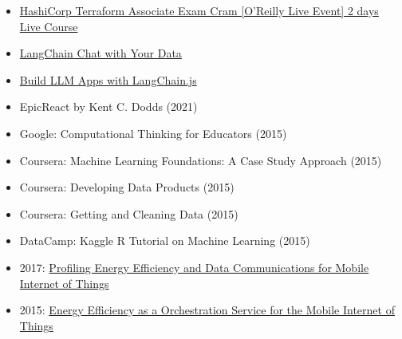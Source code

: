 \begin{minipage}[t]{0.29\textwidth}
{\begin{minipage}[t][293mm][t]{0.82\textwidth}
    \Large
    \Large
    \begin{itemize}
        \item {\href{https://github.com/p10ns11y/oreilly-terraform-live-course-sessions}{\color{sidebarlinkcolor}HashiCorp Terraform Associate Exam Cram [O'Reilly Live Event] 2 days Live Course}}
        \item {\href{https://learn.deeplearning.ai/accomplishments/f72f24f1-9ad2-4bc0-b8c2-33cbecb81ec2}{\color{sidebarlinkcolor}LangChain Chat with Your Data}}
        \item {\href{https://learn.deeplearning.ai/accomplishments/14907d64-9ff2-4dc7-b5f7-ce42982f8551?usp=sharing}{\color{sidebarlinkcolor}Build LLM Apps with LangChain.js}}
    \end{itemize}

    \Large
    \Large
    \begin{itemize}
        \item EpicReact by Kent C. Dodds (2021)
        \item Google: Computational Thinking for Educators (2015)
        \item Coursera: Machine Learning Foundations: A Case Study Approach (2015)
        \item Coursera: Developing Data Products (2015)
        \item Coursera: Getting and Cleaning Data (2015)
        \item DataCamp: Kaggle R Tutorial on Machine Learning (2015)
    \end{itemize}

    \Large
    \Large
    \begin{itemize}
        \item 2017: {\href{https://onlinelibrary.wiley.com/doi/10.1155/2017/6562915}{\color{sidebarlinkcolor}Profiling Energy Efficiency and Data Communications for Mobile Internet of Things}}
        \item 2015: {\href{https://ieeexplore.ieee.org/abstract/document/7396150}{\color{sidebarlinkcolor}Energy Efficiency as a Orchestration Service for the Mobile Internet of Things}}
    \end{itemize}

    \end{minipage}%
    \textwidth\relax%
}
\end{minipage}%
